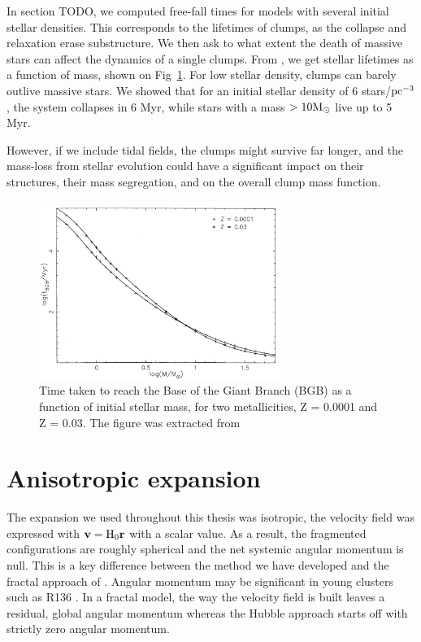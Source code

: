 In section TODO, we computed free-fall times for models with several initial stellar densities. This corresponds to the lifetimes of clumps, as the collapse and relaxation erase substructure. We then ask to what extent the death of massive stars can affect the dynamics of a single clumps. From \cite{Hurley2000}, we get stellar lifetimes as a function of mass, shown on Fig~\ref{Fig:7_stellarlifetime}. For low stellar density, clumps can barely outlive massive stars. We showed that for an initial stellar density of 6 stars/${\textrm{pc}}^{-3}$, the system collapses in 6 Myr, while stars with a mass $> 10 {\textrm{M}_\odot}$ live up to 5 Myr.

However, if we include tidal fields, the clumps might survive far longer, and the mass-loss from stellar evolution could have a significant impact on their structures, their mass segregation, and  on the overall clump mass function.


\begin{figure}
\begin{center}
\includegraphics[width=0.7\textwidth]{Figures/7_stellarlifetime.png}
\end{center}
\caption{Time taken to reach the Base of the Giant Branch (BGB) as a function of initial stellar mass, for two metallicities, Z = 0.0001 and Z = 0.03. The figure was extracted from \cite{Hurley2000}}
\label{Fig:7_stellarlifetime}
\end{figure} 



\section{Anisotropic expansion}

The \HubLem expansion we used throughout this thesis was isotropic, the velocity field was expressed with $\bold{v} = {\textrm{H}}_0 \bold{r}$ with \tHub a scalar value. As a result, the fragmented configurations are roughly spherical and the net systemic angular momentum is null. This is a key difference between the method we have developed and the fractal approach of \cite{Goodwin04}. Angular momentum may be significant in young clusters such as R136 \citep{Henault-Brunet2012}. In a fractal model, the way the velocity field is built leaves a residual, global angular momentum whereas the Hubble approach starts off with strictly zero angular momentum.


